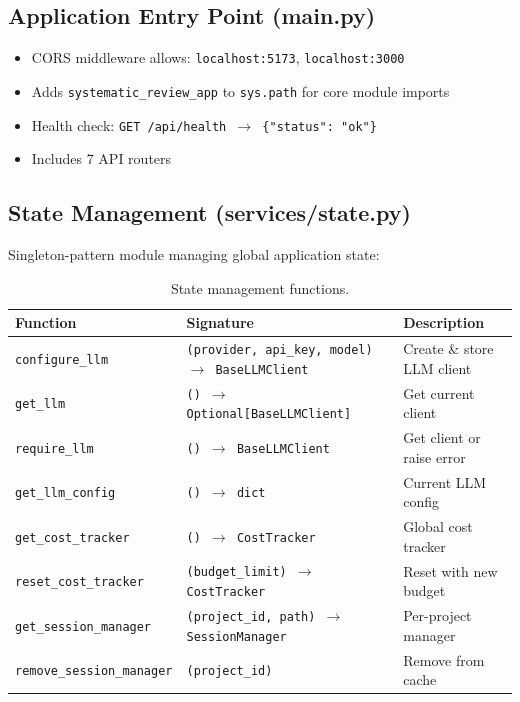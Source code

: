 \documentclass[11pt,a4paper]{article}
\begin{document}
\subsection{Application Entry Point (main.py)}

\begin{itemize}[nosep]
  \item CORS middleware allows: \texttt{localhost:5173}, \texttt{localhost:3000}
  \item Adds \texttt{systematic\_review\_app} to \texttt{sys.path} for core module imports
  \item Health check: \texttt{GET /api/health $\to$ \{"status": "ok"\}}
  \item Includes 7 API routers
\end{itemize}

\subsection{State Management (services/state.py)}

Singleton-pattern module managing global application state:

\begin{table}[H]
\centering\small
\begin{tabular}{p{4.5cm}p{4cm}p{4.5cm}}
\toprule
\textbf{Function} & \textbf{Signature} & \textbf{Description} \\
\midrule
\texttt{configure\_llm} & \texttt{(provider, api\_key, model) $\to$ BaseLLMClient} & Create \& store LLM client \\
\texttt{get\_llm} & \texttt{() $\to$ Optional[BaseLLMClient]} & Get current client \\
\texttt{require\_llm} & \texttt{() $\to$ BaseLLMClient} & Get client or raise error \\
\texttt{get\_llm\_config} & \texttt{() $\to$ dict} & Current LLM config \\
\texttt{get\_cost\_tracker} & \texttt{() $\to$ CostTracker} & Global cost tracker \\
\texttt{reset\_cost\_tracker} & \texttt{(budget\_limit) $\to$ CostTracker} & Reset with new budget \\
\texttt{get\_session\_manager} & \texttt{(project\_id, path) $\to$ SessionManager} & Per-project manager \\
\texttt{remove\_session\_manager} & \texttt{(project\_id)} & Remove from cache \\
\bottomrule
\end{tabular}
\caption{State management functions.}
\end{table}
\end{document}
